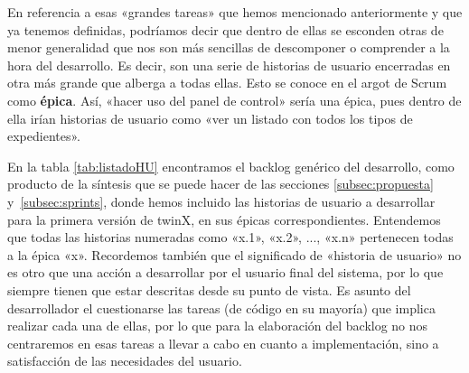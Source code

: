 En referencia a esas «grandes tareas» que hemos mencionado anteriormente y que ya tenemos definidas, podríamos decir que dentro de ellas se esconden otras de menor generalidad que nos son más sencillas de descomponer o comprender a la hora del desarrollo. Es decir, son una serie de historias de usuario encerradas en otra más grande que alberga a todas ellas. Esto se conoce en el argot de Scrum como \textbf{épica}. Así, «hacer uso del panel de control» sería una épica, pues dentro de ella irían historias de usuario como «ver un listado con todos los tipos de expedientes».

En la tabla \ref{tab:listadoHU} encontramos el backlog genérico del desarrollo, como producto de la síntesis que se puede hacer de las secciones \ref{subsec:propuesta} y~\ref{subsec:sprints}, donde hemos incluido las historias de usuario a desarrollar para la primera versión de twinX, en sus épicas correspondientes. Entendemos que todas las historias numeradas como «x.1», «x.2», ..., «x.n» pertenecen todas a la épica «x». Recordemos también que el significado de «historia de usuario» no es otro que una acción a desarrollar por el usuario final del sistema, por lo que siempre tienen que estar descritas desde su punto de vista. Es asunto del desarrollador el cuestionarse las tareas (de código en su mayoría) que implica realizar cada una de ellas, por lo que para la elaboración del backlog no nos centraremos en esas tareas a llevar a cabo en cuanto a implementación, sino a satisfacción de las necesidades del usuario.

